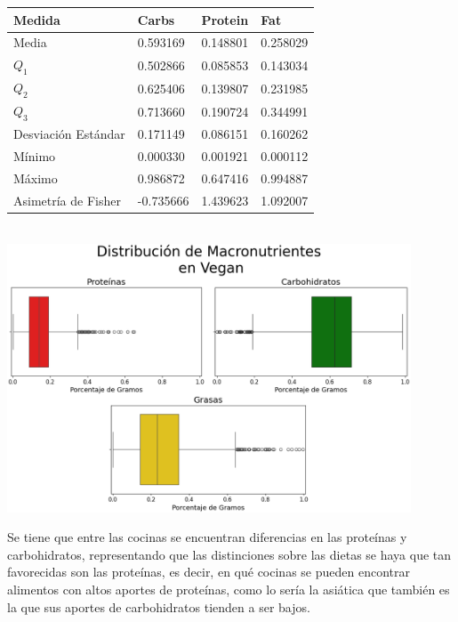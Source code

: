 \documentclass[12pt,a4paper]{article}
\begin{document}
{{            \begin{center}
                \begin{tabular}{l|lll}
                    \toprule
                        Medida & Carbs & Protein & Fat \\
                    \midrule
                        Media               & 0.593169 & 0.148801 & 0.258029 \\
                        $Q_1$               & 0.502866 & 0.085853 & 0.143034 \\
                        $Q_2$               & 0.625406 & 0.139807 & 0.231985 \\
                        $Q_3$               & 0.713660 & 0.190724 & 0.344991 \\
                        Desviación Estándar & 0.171149 & 0.086151 & 0.160262 \\
                        Mínimo              & 0.000330 & 0.001921 & 0.000112 \\
                        Máximo              & 0.986872 & 0.647416 & 0.994887 \\
                        Asimetría de Fisher & -0.735666 & 1.439623 & 1.092007 \\
                    \bottomrule
                \end{tabular}\\
                \vspace{0.5cm}
                \includegraphics[width=0.9\textwidth]{Resources/EDA/Vegan_1.png}
            \end{center}       

            Se tiene que entre las cocinas se encuentran diferencias en las 
            proteínas y carbohidratos, representando que las distinciones sobre 
            las dietas se haya que tan favorecidas son las proteínas, es decir, 
            en qué cocinas se pueden encontrar alimentos con altos aportes de proteínas, 
            como lo sería la asiática que también es la que sus aportes de carbohidratos 
            tienden a ser bajos. 

}}
\end{document}

